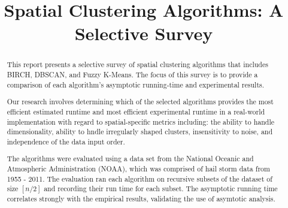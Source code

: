 \documentclass[conference, 10pt]{IEEEtran}
\begin{document}
  \title{Spatial Clustering Algorithms: A Selective Survey}


  \author{
  }

  \maketitle


  \begin{abstract}

  This report presents a selective survey of spatial clustering algorithms that includes BIRCH, DBSCAN, and Fuzzy K-Means. The focus of this survey is to provide a comparison of each algorithm's asymptotic running-time and experimental results.

  Our research involves determining which of the selected algorithms provides the most efficient estimated runtime and most efficient experimental runtime in a real-world implementation with regard to spatial-specific metrics including: the ability to handle dimensionality, ability to hndle irregularly shaped clusters, insensitivity to noise, and independence of the data input order.

  The algorithms were evaluated using a data set from the National Oceanic and Atmospheric Administration (NOAA), which was comprised of hail storm data from 1955 - 2011. The evaluation ran each algorithm on recursive subsets of the dataset of size $[n/2]$ and recording their run time for each subset. The asymptotic running time correlates strongly with the empirical results, validating the use of asymtotic analysis.

  \end{abstract}
\end{document}
